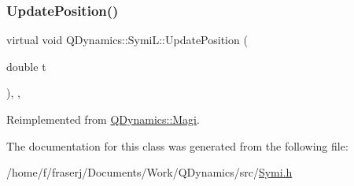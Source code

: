 \subsubsection{\texorpdfstring{Update\+Position()}{UpdatePosition()}}
{\footnotesize\ttfamily virtual void Q\+Dynamics\+::\+Symi\+L\+::\+Update\+Position (\begin{DoxyParamCaption}\item[{double}]{t }\end{DoxyParamCaption})\hspace{0.3cm}{\ttfamily [inline]}, {\ttfamily [private]}, {\ttfamily [virtual]}}



Reimplemented from \hyperlink{classQDynamics_1_1Magi_a500467f899244edfae15f34c84c7684c}{Q\+Dynamics\+::\+Magi}.



The documentation for this class was generated from the following file\+:\begin{DoxyCompactItemize}
\item 
/home/f/fraserj/\+Documents/\+Work/\+Q\+Dynamics/src/\hyperlink{Symi_8h}{Symi.\+h}\end{DoxyCompactItemize}
